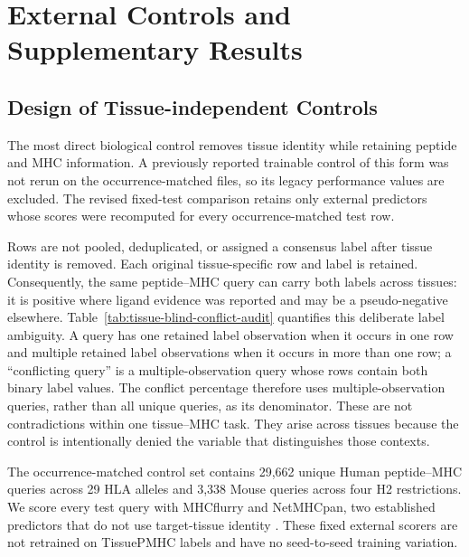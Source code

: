 \section{External Controls and Supplementary Results}

\subsection{Design of Tissue-independent Controls}

The most direct biological control removes tissue identity while retaining peptide and MHC information. A previously reported trainable control of this form was not rerun on the occurrence-matched files, so its legacy performance values are excluded. The revised fixed-test comparison retains only external predictors whose scores were recomputed for every occurrence-matched test row.

Rows are not pooled, deduplicated, or assigned a consensus label after tissue identity is removed. Each original tissue-specific row and label is retained. Consequently, the same peptide--MHC query can carry both labels across tissues: it is positive where ligand evidence was reported and may be a pseudo-negative elsewhere. Table~\ref{tab:tissue-blind-conflict-audit} quantifies this deliberate label ambiguity. A query has one retained label observation when it occurs in one row and multiple retained label observations when it occurs in more than one row; a ``conflicting query'' is a multiple-observation query whose rows contain both binary label values. The conflict percentage therefore uses multiple-observation queries, rather than all unique queries, as its denominator. These are not contradictions within one tissue--MHC task. They arise across tissues because the control is intentionally denied the variable that distinguishes those contexts.

The occurrence-matched control set contains 29,662 unique Human peptide--MHC queries across 29 HLA alleles and 3,338 Mouse queries across four H2 restrictions. We score every test query with MHCflurry and NetMHCpan, two established predictors that do not use target-tissue identity \cite{odonnell2020mhcflurry,reynisson2020netmhcpan}. These fixed external scorers are not retrained on TissuePMHC labels and have no seed-to-seed training variation.

